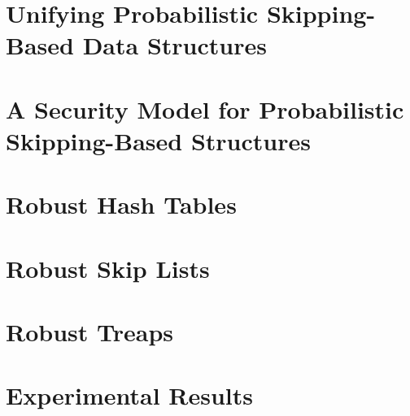 \section{Unifying Probabilistic Skipping-Based Data Structures}


\section{A Security Model for Probabilistic Skipping-Based Structures}


\section{Robust Hash Tables}\label{sec:ht}


\section{Robust Skip Lists}\label{sec:skiplist}


\section{Robust Treaps}\label{sec:treaps}


\section{Experimental Results}\label{sec:experimental}

